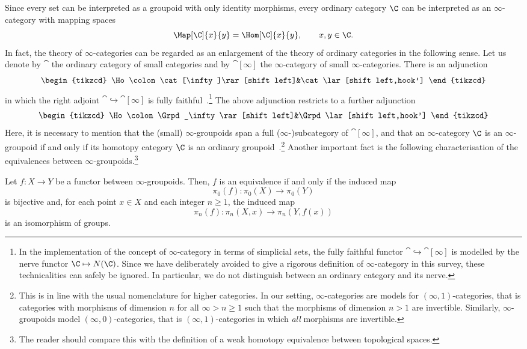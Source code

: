 \documentclass[a4paper]{amsart}
\begin{document}
Since every set can be interpreted as a groupoid with only identity morphisms,
every ordinary category $\C$ can be interpreted as an $\infty$-category with
mapping spaces
\[
  \Map[\C]{x}{y}=\Hom[\C]{x}{y},\qquad x,y\in\C.
\]
In fact, the theory of $\infty$-categories can be regarded as an enlargement of
the theory of ordinary categories in the following sense. Let us denote by
$\cat$ the ordinary category of small categories and by $\cat[\infty]$ the
$\infty$-category of small $\infty$-categories. There is an adjunction
\[
  \begin{tikzcd}
    \Ho\colon\cat[\infty]\rar[shift left]&\cat\lar[shift left,hook']
  \end{tikzcd}
\]
in which the right adjoint $\cat\hookrightarrow\cat[\infty]$ is fully
faithful~\cite[Proposition~3.3.14]{Cis19}.\footnote{In the implementation of the
  concept of $\infty$-category in terms of simplicial sets, the fully faithful
  functor $\cat\hookrightarrow\cat[\infty]$ is modelled by the nerve functor
  $\C\mapsto N(\C)$. Since we have deliberately avoided to give a rigorous
  definition of $\infty$-category in this survey, these technicalities can
  safely be ignored. In particular, we do not distinguish between an ordinary
  category and its nerve.} The above adjunction restricts to a further
adjunction
\[
  \begin{tikzcd}
    \Ho\colon\Grpd_\infty\rar[shift left]&\Grpd\lar[shift left,hook']
  \end{tikzcd}
\]
Here, it is necessary to mention that the (small) $\infty$-groupoids span a full
($\infty$-)subcategory of $\cat[\infty]$, and that an $\infty$-category $\C$ is
an $\infty$-groupoid if and only if its homotopy category $\C$ is an ordinary
groupoid~\cite[Corollary~1.4]{Joy02}.\footnote{This is in line with the usual
  nomenclature for higher categories. In our setting, $\infty$-categories are
  models for $(\infty,1)$-categories, that is categories with morphisms of
  dimension $n$ for all ${\infty>n\geq1}$ such that the morphisms of
  dimension $n>1$ are invertible. Similarly, $\infty$-groupoids model
  $(\infty,0)$-categories, that is $(\infty,1)$-categories in which \emph{all}
  morphisms are invertible.} Another important fact is the following
characterisation of the equivalences between $\infty$-groupoids.\footnote{The
  reader should compare this with the definition of a weak homotopy equivalence
  between topological spaces.}

\begin{theorem}
  \label{thm:gpd-equivalences}
  Let $f\colon X\to Y$ be a functor between $\infty$-groupoids. Then, $f$ is an
  equivalence if and only if the induced map
  \[
    \pi_0(f)\colon\pi_0(X)\longrightarrow\pi_0(Y)
  \]
  is bijective and, for each point $x\in X$ and each integer $n\geq1$, the
  induced map
  \[
    \pi_n(f)\colon\pi_n(X,x)\longrightarrow\pi_n(Y,f(x))
  \]
  is an isomorphism of groups.
\end{theorem}
\end{document}
